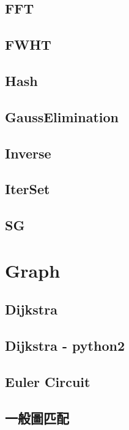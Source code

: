 \subsection{FFT}

\subsection{FWHT}

\subsection{Hash}

\subsection{GaussElimination}

\subsection{Inverse}

\subsection{IterSet}

\subsection{SG}


\section{Graph}

\subsection{Dijkstra}

\subsection{Dijkstra - python2}

\subsection{Euler Circuit}

\subsection{一般圖匹配}

